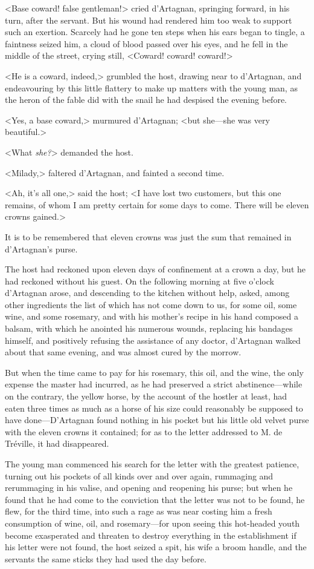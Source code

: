 <Base coward! false gentleman!> cried d'Artagnan, springing forward, in his turn, after the servant. But his wound had rendered him too weak to support such an exertion. Scarcely had he gone ten steps when his ears began to tingle, a faintness seized him, a cloud of blood passed over his eyes, and he fell in the middle of the street, crying still, <Coward! coward! coward!> 

<He is a coward, indeed,> grumbled the host, drawing near to d'Artagnan, and endeavouring by this little flattery to make up matters with the young man, as the heron of the fable did with the snail he had despised the evening before. 

<Yes, a base coward,> murmured d'Artagnan; <but she---she was very beautiful.> 

<What \textit{she?}> demanded the host. 

<Milady,> faltered d'Artagnan, and fainted a second time. 

<Ah, it's all one,> said the host; <I have lost two customers, but this one remains, of whom I am pretty certain for some days to come. There will be eleven crowns gained.> 

It is to be remembered that eleven crowns was just the sum that remained in d'Artagnan's purse. 

The host had reckoned upon eleven days of confinement at a crown a day, but he had reckoned without his guest. On the following morning at five o'clock d'Artagnan arose, and descending to the kitchen without help, asked, among other ingredients the list of which has not come down to us, for some oil, some wine, and some rosemary, and with his mother's recipe in his hand composed a balsam, with which he anointed his numerous wounds, replacing his bandages himself, and positively refusing the assistance of any doctor, d'Artagnan walked about that same evening, and was almost cured by the morrow. 

But when the time came to pay for his rosemary, this oil, and the wine, the only expense the master had incurred, as he had preserved a strict abstinence---while on the contrary, the yellow horse, by the account of the hostler at least, had eaten three times as much as a horse of his size could reasonably be supposed to have done---D'Artagnan found nothing in his pocket but his little old velvet purse with the eleven crowns it contained; for as to the letter addressed to M. de Tréville, it had disappeared. 

The young man commenced his search for the letter with the greatest patience, turning out his pockets of all kinds over and over again, rummaging and rerummaging in his valise, and opening and reopening his purse; but when he found that he had come to the conviction that the letter was not to be found, he flew, for the third time, into such a rage as was near costing him a fresh consumption of wine, oil, and rosemary---for upon seeing this hot-headed youth become exasperated and threaten to destroy everything in the establishment if his letter were not found, the host seized a spit, his wife a broom handle, and the servants the same sticks they had used the day before. 

